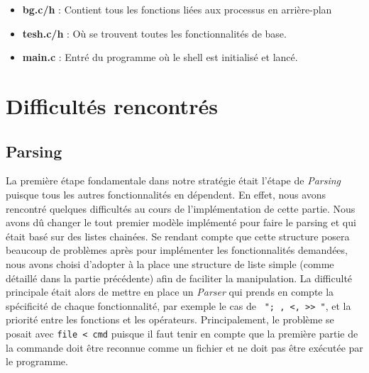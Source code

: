 \documentclass[12pt]{article}
\begin{document}
\begin{itemize}
    \item \textbf{bg.c/h} : Contient tous les fonctions liées aux processus en arrière-plan
    \item \textbf{tesh.c/h} : Où se trouvent toutes les fonctionnalités de base.
    \item \textbf{main.c} : Entré du programme où le shell est initialisé et lancé.
\end{itemize}

\newpage

\section{Difficultés rencontrés} 
\subsection{Parsing}
La première étape fondamentale dans notre stratégie était l'étape de \textit{Parsing} puisque tous les autres fonctionnalités en dépendent. En effet, nous avons rencontré quelques difficultés au cours de l'implémentation de cette partie. Nous avons dû changer le tout premier modèle implémenté pour faire le parsing et qui était basé sur des listes chainées. Se rendant compte que cette structure posera beaucoup de problèmes après pour implémenter les fonctionnalités demandées, nous avons choisi d'adopter à la place une structure de liste simple (comme détaillé dans la partie précédente) afin de faciliter la manipulation. La difficulté principale était alors de mettre en place un \textit{Parser} qui prends en compte la spécificité de chaque fonctionnalité, par exemple le cas de \texttt{ "; , <, >{}> "}, et la priorité entre les fonctions et les opérateurs. Principalement, le problème se posait avec \texttt{file < cmd} puisque il faut tenir en compte que la première partie de la commande doit être reconnue comme un fichier et ne doit pas être exécutée par le programme.
\end{document}
